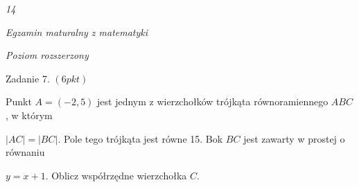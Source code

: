 \documentclass[a4paper,12pt]{article}
\begin{document}
{\it 14}

{\it Egzamin maturalny z matematyki}

{\it Poziom rozszerzony}

Zadanie 7. $(6pkt)$

Punkt $A=(-2,5)$ jest jednym z wierzchołków trójkąta równoramiennego $ABC$, w którym

$|AC|=|BC|$. Pole tego trójkąta jest równe 15. Bok $BC$ jest zawarty w prostej o równaniu

$y=x+1$. Oblicz współrzędne wierzchołka $C.$
\end{document}
